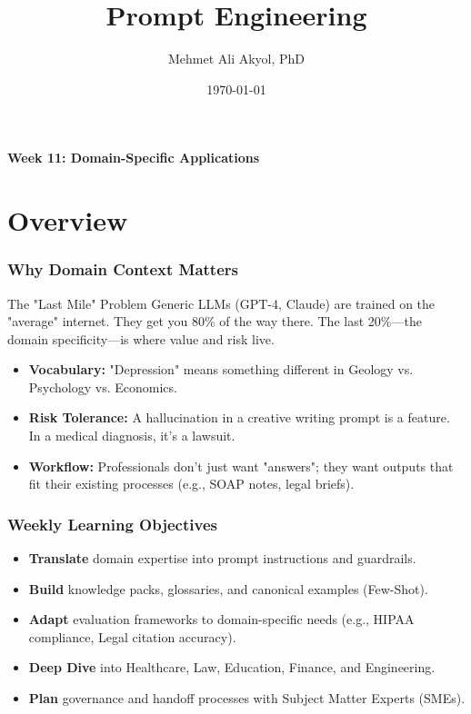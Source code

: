 \documentclass{beamer}
\title{Prompt Engineering}
\author{Mehmet Ali Akyol, PhD}
\institute{Ankara Medipol University}
\date{\today}
\begin{document}
\begin{frame}
    \titlepage
    \begin{center}
        \vspace{1cm}
        \textbf{Week 11: Domain-Specific Applications}
    \end{center}
\end{frame}

\section{Overview}

\begin{frame}
    \frametitle{Why Domain Context Matters}
    \begin{block}{The "Last Mile" Problem}
        Generic LLMs (GPT-4, Claude) are trained on the "average" internet. They get you 80\% of the way there. The last 20\%—the domain specificity—is where value and risk live.
    \end{block}
    \begin{itemize}
        \item \textbf{Vocabulary:} "Depression" means something different in Geology vs. Psychology vs. Economics.
        \item \textbf{Risk Tolerance:} A hallucination in a creative writing prompt is a feature. In a medical diagnosis, it's a lawsuit.
        \item \textbf{Workflow:} Professionals don't just want "answers"; they want outputs that fit their existing processes (e.g., SOAP notes, legal briefs).
    \end{itemize}
\end{frame}

\begin{frame}
    \frametitle{Weekly Learning Objectives}
    \begin{itemize}
        \item \textbf{Translate} domain expertise into prompt instructions and guardrails.
        \item \textbf{Build} knowledge packs, glossaries, and canonical examples (Few-Shot).
        \item \textbf{Adapt} evaluation frameworks to domain-specific needs (e.g., HIPAA compliance, Legal citation accuracy).
        \item \textbf{Deep Dive} into Healthcare, Law, Education, Finance, and Engineering.
        \item \textbf{Plan} governance and handoff processes with Subject Matter Experts (SMEs).
    \end{itemize}
\end{frame}
\end{document}
